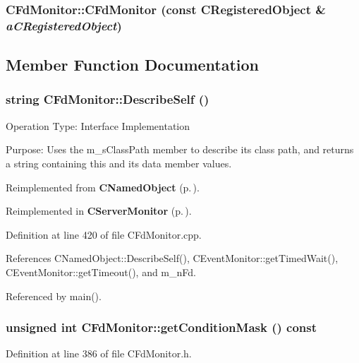 \subsubsection{\setlength{\rightskip}{0pt plus 5cm}CFd\-Monitor::CFd\-Monitor (const {\bf CRegistered\-Object} \& {\em a\-CRegistered\-Object})\hspace{0.3cm}{\tt  [private]}}\label{classCFdMonitor_c0}




\subsection{Member Function Documentation}
\subsubsection{\setlength{\rightskip}{0pt plus 5cm}string CFd\-Monitor::Describe\-Self ()\hspace{0.3cm}{\tt  [virtual]}}\label{classCFdMonitor_a12}


Operation Type: Interface Implementation

Purpose: Uses the m\_\-s\-Class\-Path member to describe its class path, and returns a string containing this and its data member values. 

Reimplemented from {\bf CNamed\-Object} {\rm (p.\,\pageref{classCNamedObject_a8})}.

Reimplemented in {\bf CServer\-Monitor} {\rm (p.\,\pageref{classCServerMonitor_a8})}.

Definition at line 420 of file CFd\-Monitor.cpp.

References CNamed\-Object::Describe\-Self(), CEvent\-Monitor::get\-Timed\-Wait(), CEvent\-Monitor::get\-Timeout(), and m\_\-n\-Fd.

Referenced by main().
\subsubsection{\setlength{\rightskip}{0pt plus 5cm}unsigned int CFd\-Monitor::get\-Condition\-Mask () const\hspace{0.3cm}{\tt  [inline]}}\label{classCFdMonitor_a6}




Definition at line 386 of file CFd\-Monitor.h.

